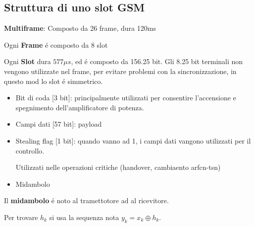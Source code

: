 \documentclass{article}
\begin{document}
\subsection{Struttura di uno slot GSM}
\begin{center}
\end{center}

\textbf{Multiframe}: Composto da 26 frame, dura 120ms

Ogni \textbf{Frame} \'e composto da 8 slot

Ogni \textbf{Slot} dura $577\mu s$, ed \'e composto da 156.25 bit. Gli 8.25 bit terminali non vengono utilizzate nel frame, per evitare problemi con la sincronizzazione, in questo mod lo slot \'e simmetrico.


\begin{itemize}
    \item Bit di coda [3 bit]: principalmente utilizzati per consentire l'accensione e spegnimento dell'amplificatore di potenza.
    \item Campi dati [57 bit]: payload
    \item Stealing flag [1 bit]: quando vanno ad 1, i campi dati vangono utilizzati per il controllo.

        Utilizzati nelle operazioni critiche (handover, cambiaento arfcn-tsn)
    \item Midambolo
\end{itemize}

Il \textbf{midambolo} \'e noto al tramettotore ad al ricevitore.

\begin{center}
\end{center}

Per trovare $h_k$ si usa la sequenza nota $y_k = x_k \oplus h_k$.
\end{document}
